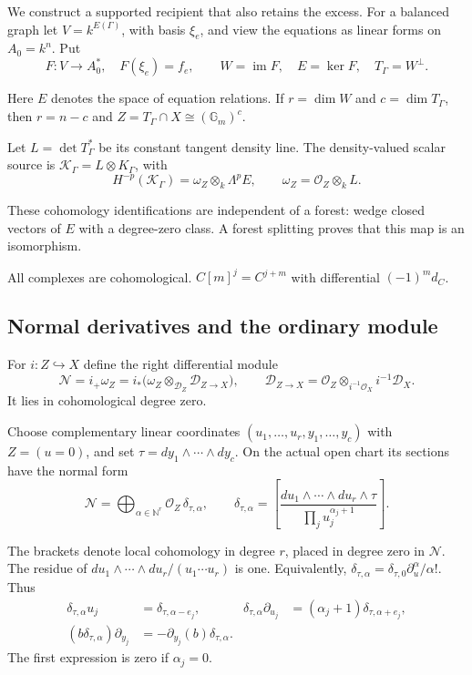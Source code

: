 We construct a supported recipient that also retains the excess.
For a balanced graph let $V=k^{E(\Gamma)}$, with basis $\xi_e$,
and view the equations as linear forms on $A_0=k^n$. Put
\begin{equation}\label{v4-arith:curve:eq:linear-data}
 F:V\longrightarrow A_0^*,\quad F(\xi_e)=f_e,\qquad
 W=\operatorname{im}F,\quad E=\ker F,\quad T_\Gamma=W^\perp .
\end{equation}

Here $E$ denotes the space of equation relations. If $r=\dim W$
and $c=\dim T_\Gamma$, then $r=n-c$ and
$Z=T_\Gamma\cap X\cong(\mathbb G_m)^c$.

Let $L=\det T_\Gamma^*$ be its constant tangent density line.
The density-valued scalar source is
$\mathcal K_\Gamma=L\otimes K_\Gamma$, with
\[
 H^{-p}(\mathcal K_\Gamma)=\omega_Z\otimes_k\Lambda^pE,
 \qquad \omega_Z=\mathcal O_Z\otimes_k L.
\]

These cohomology identifications are independent of a forest:
wedge closed vectors of $E$ with a degree-zero class. A forest
splitting proves that this map is an isomorphism.

All complexes are cohomological. $C[m]^j=C^{j+m}$ with
differential $(-1)^m d_C$.

\subsection{Normal derivatives and the ordinary module}

For $i:Z\hookrightarrow X$ define the right differential module
\[
 \mathcal N=i_+\omega_Z
 =i_*\bigl(\omega_Z\otimes_{\mathcal D_Z}\mathcal D_{Z\to X}\bigr),
 \qquad
 \mathcal D_{Z\to X}
 =\mathcal O_Z\otimes_{i^{-1}\mathcal O_X}i^{-1}\mathcal D_X.
\]
It lies in cohomological degree zero.

Choose complementary linear
coordinates $(u_1,\ldots,u_r,y_1,\ldots,y_c)$ with $Z=(u=0)$,
and set $\tau=dy_1\wedge\cdots\wedge dy_c$.
On the actual open chart its sections have the normal form
\begin{equation}\label{v4-arith:curve:eq:normal-jets}
 \mathcal N=\bigoplus_{\alpha\in\mathbb N^r}
       \mathcal O_Z\,\delta_{\tau,\alpha},\qquad
 \delta_{\tau,\alpha}
 =\left[\frac{du_1\wedge\cdots\wedge du_r\wedge\tau}
                    {\prod_j u_j^{\alpha_j+1}}\right].
\end{equation}

The brackets denote local cohomology in degree $r$, placed in
degree zero in $\mathcal N$. The residue of
$du_1\wedge\cdots\wedge du_r/(u_1\cdots u_r)$ is one.
Equivalently,
$\delta_{\tau,\alpha}=\delta_{\tau,0}\partial_u^\alpha/\alpha!$.
Thus
\begin{equation}\label{v4-arith:curve:eq:jet-actions}
 \begin{aligned}
 \delta_{\tau,\alpha}u_j&=\delta_{\tau,\alpha-e_j},&
 \delta_{\tau,\alpha}\partial_{u_j}
       &=(\alpha_j+1)\delta_{\tau,\alpha+e_j},\\
 (b\delta_{\tau,\alpha})\partial_{y_j}
       &=-\partial_{y_j}(b)\delta_{\tau,\alpha}.
 \end{aligned}
\end{equation}
The first expression is zero if $\alpha_j=0$.

